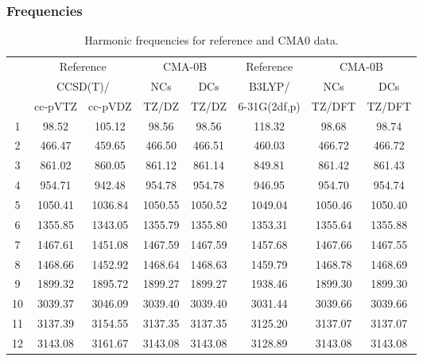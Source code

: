 \documentclass[10pt,oneside]{article}
\begin{document}
\subsubsection*{Frequencies}
\begin{table}[h!]
\centering
\caption{Harmonic frequencies for reference and CMA0 data.}
\begin{tabular}{cccccccc}
\toprule
{} & \multicolumn{2}{c}{Reference} & \multicolumn{2}{c}{CMA-0B} &    Reference & \multicolumn{2}{c}{CMA-0B} \\
{} & \multicolumn{2}{c}{CCSD(T)/} &     NCs &     DCs &       B3LYP/ &     NCs &     DCs \\
{} &   cc-pVTZ & cc-pVDZ &   TZ/DZ &   TZ/DZ & 6-31G(2df,p) &  TZ/DFT &  TZ/DFT \\
\midrule
1  &     98.52 &  105.12 &   98.56 &   98.56 &       118.32 &   98.68 &   98.74 \\
2  &    466.47 &  459.65 &  466.50 &  466.51 &       460.03 &  466.72 &  466.72 \\
3  &    861.02 &  860.05 &  861.12 &  861.14 &       849.81 &  861.42 &  861.43 \\
4  &    954.71 &  942.48 &  954.78 &  954.78 &       946.95 &  954.70 &  954.74 \\
5  &   1050.41 & 1036.84 & 1050.55 & 1050.52 &      1049.04 & 1050.46 & 1050.40 \\
6  &   1355.85 & 1343.05 & 1355.79 & 1355.80 &      1353.31 & 1355.64 & 1355.88 \\
7  &   1467.61 & 1451.08 & 1467.59 & 1467.59 &      1457.68 & 1467.66 & 1467.55 \\
8  &   1468.66 & 1452.92 & 1468.64 & 1468.63 &      1459.79 & 1468.78 & 1468.69 \\
9  &   1899.32 & 1895.72 & 1899.27 & 1899.27 &      1938.46 & 1899.30 & 1899.30 \\
10 &   3039.37 & 3046.09 & 3039.40 & 3039.40 &      3031.44 & 3039.66 & 3039.66 \\
11 &   3137.39 & 3154.55 & 3137.35 & 3137.35 &      3125.20 & 3137.07 & 3137.07 \\
12 &   3143.08 & 3161.67 & 3143.08 & 3143.08 &      3128.89 & 3143.08 & 3143.08 \\
\bottomrule
\end{tabular}
\end{table}

\clearpage
\end{document}
